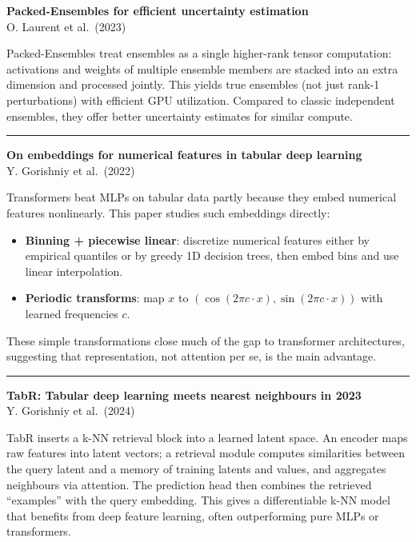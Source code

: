 \documentclass[a5paper]{article}
\providecommand{\tightlist}{%
  \setlength{\itemsep}{0pt}\setlength{\parskip}{0pt}}
\begin{document}
\textbf{Packed-Ensembles for efficient uncertainty estimation}\\
O. Laurent et al.~(2023)

Packed-Ensembles treat ensembles as a single higher-rank tensor
computation: activations and weights of multiple ensemble members are
stacked into an extra dimension and processed jointly. This yields true
ensembles (not just rank-1 perturbations) with efficient GPU
utilization. Compared to classic independent ensembles, they offer
better uncertainty estimates for similar compute.

\begin{center}\rule{0.5\linewidth}{0.5pt}\end{center}

\textbf{On embeddings for numerical features in tabular deep learning}\\
Y. Gorishniy et al.~(2022)

Transformers beat MLPs on tabular data partly because they embed
numerical features nonlinearly. This paper studies such embeddings
directly:

\begin{itemize}
\tightlist
\item
  \textbf{Binning + piecewise linear}: discretize numerical features
  either by empirical quantiles or by greedy 1D decision trees, then
  embed bins and use linear interpolation.
\item
  \textbf{Periodic transforms}: map $x$ to $(\cos(2\pi c\cdot x), \sin(2\pi c\cdot x))$ with
  learned frequencies $c$.
\end{itemize}

These simple transformations close much of the gap to transformer
architectures, suggesting that representation, not attention per se, is
the main advantage.

\begin{center}\rule{0.5\linewidth}{0.5pt}\end{center}

\textbf{TabR: Tabular deep learning meets nearest neighbours in 2023}\\
Y. Gorishniy et al.~(2024)

TabR inserts a k-NN retrieval block into a learned latent space. An
encoder maps raw features into latent vectors; a retrieval module
computes similarities between the query latent and a memory of training
latents and values, and aggregates neighbours via attention. The
prediction head then combines the retrieved ``examples'' with the query
embedding. This gives a differentiable k-NN model that benefits from
deep feature learning, often outperforming pure MLPs or transformers.
\end{document}
